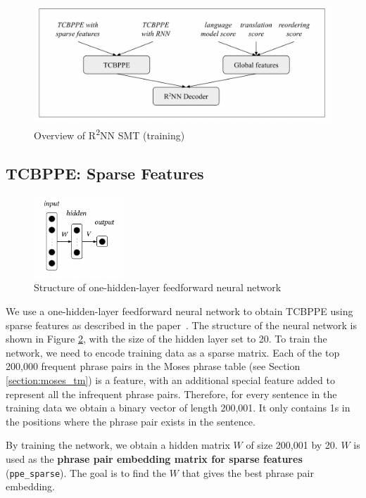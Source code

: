 \documentclass[12pt,a4paper,twoside]{report}
\begin{document}
\begin{figure}[ht]
\centering
\includegraphics[width=1\textwidth]{images/r2nn_pipeline.png}
\caption{Overview of R\textsuperscript{2}NN SMT (training)}
\label{fig:r2nn_pipeline}
\end{figure}

\subsection{TCBPPE: Sparse Features} \label{section:TCBPPE_sparse}
\begin{figure}[ht]
\centering
\includegraphics[width=0.3\textwidth]{images/one_hidden_layer.png}
\caption{Structure of one-hidden-layer feedforward neural network}
\label{fig:one_hidden_layer}
\end{figure}

We use a one-hidden-layer feedforward neural network to obtain TCBPPE using sparse features as described in the paper~\cite{r2nn}. The structure of the neural network is shown in Figure \ref{fig:one_hidden_layer}, with the size of the hidden layer set to 20. To train the network, we need to encode training data as a sparse matrix. Each of the top 200,000 frequent phrase pairs in the Moses phrase table (see Section \ref{section:moses_tm}) is a feature, with an additional special feature added to represent all the infrequent phrase pairs. Therefore, for every sentence in the training data we obtain a binary vector of length 200,001. It only contains 1s in the positions where the phrase pair exists in the sentence.

By training the network, we obtain a hidden matrix $W$ of size 200,001 by 20. $W$ is used as the \textbf{phrase pair embedding matrix for sparse features} (\texttt{ppe\_sparse}). The goal is to find the $W$ that gives the best phrase pair embedding.
\end{document}
